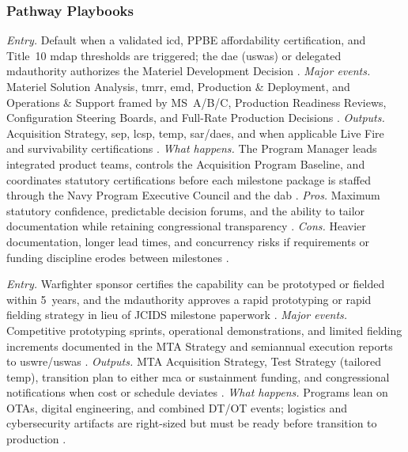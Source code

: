 \documentclass[../main.tex]{subfiles}
\begin{document}
\subsubsection{Pathway Playbooks}
\begin{description}[style=nextline,labelsep=0.5em,font=\bfseries]
  \item[Major Capability Acquisition.]
    \textit{Entry.} Default when a validated \ac{icd}, PPBE affordability certification, and Title~10 \ac{mdap} thresholds are triggered; the \ac{dae} (\ac{uswas}) or delegated \ac{mdauthority} authorizes the Materiel Development Decision \autocite{DoDI5000-02,DoDI5000-85,USC-10-4201}.
    \textit{Major events.} Materiel Solution Analysis, \ac{tmrr}, \ac{emd}, Production \& Deployment, and Operations \& Support framed by MS~A/B/C, Production Readiness Reviews, Configuration Steering Boards, and Full-Rate Production Decisions \autocite{DoDI5000-85}.
    \textit{Outputs.} Acquisition Strategy, \ac{sep}, \ac{lcsp}, \ac{temp}, \ac{sar}/\ac{daes}, and when applicable Live Fire and survivability certifications \autocite{DoDI5000-85,DoDI5000-89,USC-10-2366}.
    \textit{What happens.} The Program Manager leads integrated product teams, controls the Acquisition Program Baseline, and coordinates statutory certifications before each milestone package is staffed through the Navy Program Executive Council and the \ac{dab} \autocite{DoDI5000-85}.
    \textit{Pros.} Maximum statutory confidence, predictable decision forums, and the ability to tailor documentation while retaining congressional transparency \autocite{DoDI5000-85}.
    \textit{Cons.} Heavier documentation, longer lead times, and concurrency risks if requirements or funding discipline erodes between milestones \autocite{DoDI5000-85}.
  \item[Middle Tier of Acquisition.]
    \textit{Entry.} Warfighter sponsor certifies the capability can be prototyped or fielded within 5~years, and the \ac{mdauthority} approves a rapid prototyping or rapid fielding strategy in lieu of JCIDS milestone paperwork \autocite{DoDI5000-80}.
    \textit{Major events.} Competitive prototyping sprints, operational demonstrations, and limited fielding increments documented in the MTA Strategy and semiannual execution reports to \ac{uswre}/\ac{uswas} \autocite{DoDI5000-80}.
    \textit{Outputs.} MTA Acquisition Strategy, Test Strategy (tailored \ac{temp}), transition plan to either \ac{mca} or sustainment funding, and congressional notifications when cost or schedule deviates \autocite{DoDI5000-80}.
    \textit{What happens.} Programs lean on OTAs, digital engineering, and combined DT/OT events; logistics and cybersecurity artifacts are right-sized but must be ready before transition to production \autocite{DoDI5000-80}.

\end{description}
\end{document}
